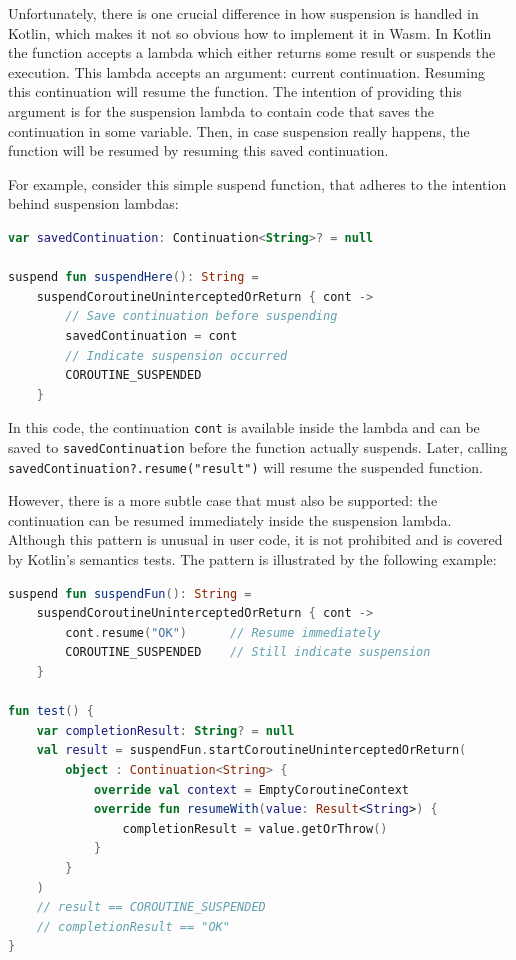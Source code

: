 Unfortunately, there is one crucial difference in how suspension is handled in Kotlin, which makes it not so obvious how to
implement it in Wasm. In Kotlin the function \suspendCoroutineUninterceptedOrReturn
accepts a lambda which either returns some result or suspends the execution. This lambda accepts an argument: current
continuation. Resuming this continuation will resume the function. The intention of providing this argument is
for the suspension lambda to contain code that saves the continuation in some variable. Then, in case
suspension really happens, the function will be resumed by resuming this saved continuation.

For example, consider this simple suspend function, that adheres to the intention behind suspension lambdas:

\begin{lstlisting}[language=Kotlin, basicstyle=\footnotesize\ttfamily]
var savedContinuation: Continuation<String>? = null

suspend fun suspendHere(): String = 
    suspendCoroutineUninterceptedOrReturn { cont ->
        // Save continuation before suspending
        savedContinuation = cont
        // Indicate suspension occurred
        COROUTINE_SUSPENDED
    }
\end{lstlisting}

In this code, the continuation \texttt{cont} is available inside the lambda and can be saved to
\texttt{savedContinuation} before the function actually suspends. Later, calling
\texttt{savedContinuation?.resume("result")} will resume the suspended function.

However, there is a more subtle case that must also be supported: the continuation can be resumed immediately inside
the suspension lambda. Although this pattern is unusual in user code, it is not prohibited and is covered by Kotlin's
semantics tests. The pattern is illustrated by the following example:

\begin{lstlisting}[language=Kotlin, basicstyle=\footnotesize\ttfamily]
suspend fun suspendFun(): String =
    suspendCoroutineUninterceptedOrReturn { cont ->
        cont.resume("OK")      // Resume immediately
        COROUTINE_SUSPENDED    // Still indicate suspension
    }

fun test() {
    var completionResult: String? = null
    val result = suspendFun.startCoroutineUninterceptedOrReturn(
        object : Continuation<String> {
            override val context = EmptyCoroutineContext
            override fun resumeWith(value: Result<String>) {
                completionResult = value.getOrThrow()
            }
        }
    )
    // result == COROUTINE_SUSPENDED
    // completionResult == "OK"
}
\end{lstlisting}

